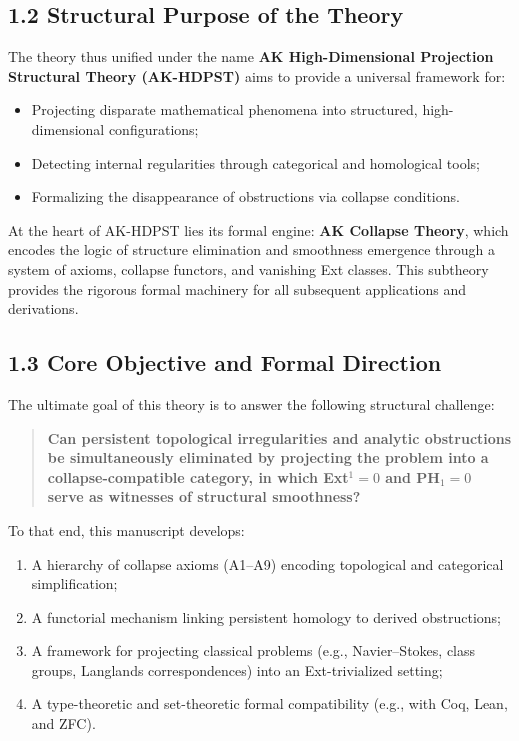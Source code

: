 \documentclass[11pt]{article}
\begin{document}
\subsection*{1.2 Structural Purpose of the Theory}

The theory thus unified under the name  
\textbf{AK High-Dimensional Projection Structural Theory (AK-HDPST)}  
aims to provide a universal framework for:

\begin{itemize}
  \item Projecting disparate mathematical phenomena into structured, high-dimensional configurations;
  \item Detecting internal regularities through categorical and homological tools;
  \item Formalizing the disappearance of obstructions via collapse conditions.
\end{itemize}

At the heart of AK-HDPST lies its formal engine:
\textbf{AK Collapse Theory}, which encodes the logic of structure elimination and smoothness emergence  
through a system of axioms, collapse functors, and vanishing Ext classes.  
This subtheory provides the rigorous formal machinery for all subsequent applications and derivations.

\subsection*{1.3 Core Objective and Formal Direction}

The ultimate goal of this theory is to answer the following structural challenge:

\begin{quote}
\textbf{Can persistent topological irregularities and analytic obstructions be simultaneously eliminated  
by projecting the problem into a collapse-compatible category,  
in which Ext$^1 = 0$ and PH$_1 = 0$ serve as witnesses of structural smoothness?}
\end{quote}

To that end, this manuscript develops:

\begin{enumerate}
  \item A hierarchy of collapse axioms (A1–A9) encoding topological and categorical simplification;
  \item A functorial mechanism linking persistent homology to derived obstructions;
  \item A framework for projecting classical problems (e.g., Navier–Stokes, class groups, Langlands correspondences)  
        into an Ext-trivialized setting;
  \item A type-theoretic and set-theoretic formal compatibility (e.g., with Coq, Lean, and ZFC).
\end{enumerate}
\end{document}
